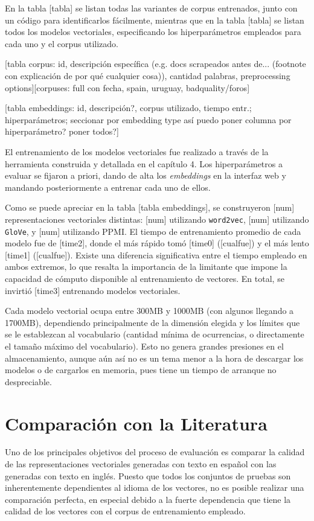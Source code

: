 En la tabla [tabla] se listan todas las variantes de corpus entrenados, junto con un código para
identificarlos fácilmente, mientras que en la tabla [tabla] se listan todos los modelos vectoriales,
especificando los hiperparámetros empleados para cada uno y el corpus utilizado.

[tabla corpus: id, descripción específica (e.g. docs scrapeados antes de... (footnote con
explicación de por qué cualquier cosa)), cantidad palabras, preprocessing options][corpuses: full
con fecha, spain, uruguay, badquality/foros]

[tabla embeddings: id, descripción?, corpus utilizado, tiempo entr.; hiperparámetros; seccionar por
embedding type así puedo poner columna por hiperparámetro? poner todos?]


El entrenamiento de los modelos vectoriales fue realizado a través de la herramienta construida y
detallada en el capítulo 4. Los hiperparámetros a evaluar se fijaron a priori, dando de alta los
\textit{embeddings} en la interfaz web y mandando posteriormente a entrenar cada uno de ellos.

Como se puede apreciar en la tabla [tabla embeddings], se construyeron [num] representaciones
vectoriales distintas: [num] utilizando \texttt{word2vec}, [num] utilizando \texttt{GloVe}, y [num]
utilizando PPMI\@. El tiempo de entrenamiento promedio de cada modelo fue de [time2], donde el más
rápido tomó [time0] ([cualfue]) y el más lento [time1] ([cualfue]). Existe una diferencia
significativa entre el tiempo empleado en ambos extremos, lo que resalta la importancia de la
limitante que impone la capacidad de cómputo disponible al entrenamiento de vectores. En total, se
invirtió [time3] entrenando modelos vectoriales.

Cada modelo vectorial ocupa entre 300MB y 1000MB (con algunos llegando a 1700MB), dependiendo
principalmente de la dimensión elegida y los límites que se le establezcan al vocabulario (cantidad
mínima de ocurrencias, o directamente el tamaño máximo del vocabulario). Esto no genera grandes
presiones en el almacenamiento, aunque aún así no es un tema menor a la hora de descargar los
modelos o de cargarlos en memoria, pues tiene un tiempo de arranque no despreciable.


\section{Comparación con la Literatura}

Uno de los principales objetivos del proceso de evaluación es comparar la calidad de las
representaciones vectoriales generadas con texto en español con las generadas con texto en
inglés. Puesto que todos los conjuntos de pruebas son inherentemente dependientes al idioma de los
vectores, no es posible realizar una comparación perfecta, en especial debido a la fuerte
dependencia que tiene la calidad de los vectores con el corpus de entrenamiento empleado.


